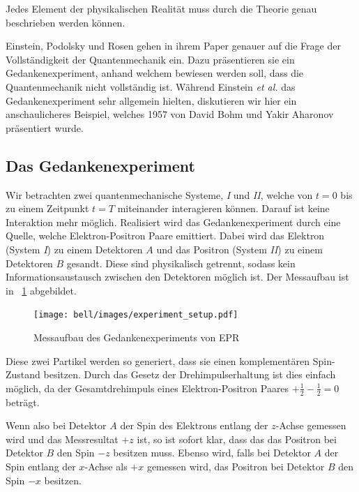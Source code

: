 \begin{refsection}
\begin{definition}\label{def:bell:Vollstaendigkeit}
    Jedes Element der physikalischen Realit\"at muss durch die Theorie
    genau beschrieben werden k\"onnen.
\end{definition}

Einstein, Podolsky und Rosen gehen in ihrem Paper genauer auf die Frage
der Vollst\"andigkeit der Quantenmechanik ein.
Dazu pr\"asentieren sie ein Gedankenexperiment, anhand welchem bewiesen
werden soll, dass die Quantenmechanik nicht vollst\"andig ist.
W\"ahrend Einstein \emph{et al.} das Gedankenexperiment sehr
allgemein hielten, diskutieren wir hier ein anschaulicheres Beispiel, welches
1957 von David Bohm und Yakir Aharonov \cite{Bell:Bohm1957} pr\"asentiert
wurde.

\subsection{Das Gedankenexperiment\label{subsection:bell:epr:idee}}
Wir betrachten zwei quantenmechanische Systeme, \textit{I} und \textit{II},
welche von $t=0$ bis zu einem Zeitpunkt $t=T$ miteinander 
interagieren k\"onnen. Darauf ist keine Interaktion mehr m\"oglich.
Realisiert wird das Gedankenexperiment durch eine Quelle, welche
Elektron-Positron Paare emittiert. 
Dabei wird das Elektron (System \textit{I}) zu einem Detektoren $A$ und das 
Positron (System \textit{II}) zu einem Detektoren $B$ gesandt.
Diese sind physikalisch getrennt, sodass kein Informationsaustausch
zwischen den Detektoren m\"oglich ist.
Der Messaufbau ist in \figurename~\ref{fig:bell:EPR_Messaufbau} abgebildet.

\begin{figure}
    \centering
    \texttt{[image: bell/images/experiment\_setup.pdf]}
    \caption{Messaufbau des Gedankenexperiments von EPR}
    \label{fig:bell:EPR_Messaufbau}
\end{figure}

Diese zwei Partikel werden so generiert, dass sie einen komplement\"aren
Spin-Zustand besitzen. 
Durch das Gesetz der Drehimpulserhaltung
ist dies einfach m\"oglich, da der Gesamtdrehimpuls eines Elektron-Positron 
Paares $+\frac12 - \frac12 = 0$ betr\"agt.

Wenn also bei Detektor $A$ der Spin des Elektrons entlang der $z$-Achse
gemessen wird und das Messresultat $+z$ ist, so ist sofort klar, dass
das das Positron bei Detektor $B$ den Spin $-z$ besitzen muss. 
Ebenso wird, falls bei Detektor $A$ der Spin entlang der $x$-Achse als $+x$
gemessen wird, das Positron bei Detektor $B$ den Spin $-x$ besitzen.


\end{refsection}
